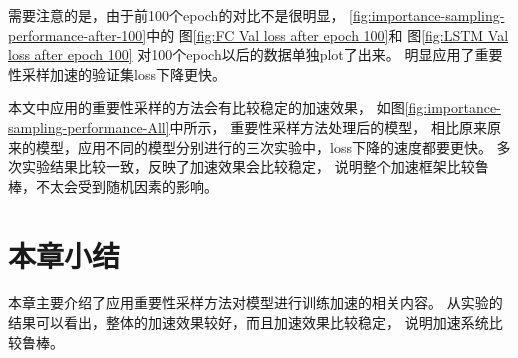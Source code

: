   需要注意的是，由于前100个epoch的对比不是很明显，
  \ref{fig:importance-sampling-performance-after-100}中的
  图\ref{fig:FC Val loss after epoch 100}和
  图\ref{fig:LSTM Val loss after epoch 100}
  对100个epoch以后的数据单独plot了出来。
  明显应用了重要性采样加速的验证集loss下降更快。

  本文中应用的重要性采样的方法会有比较稳定的加速效果，
  如图\ref{fig:importance-sampling-performance-All}中所示，
  重要性采样方法处理后的模型，
  相比原来原来的模型，应用不同的模型分别进行的三次实验中，loss下降的速度都要更快。
  多次实验结果比较一致，反映了加速效果会比较稳定，
  说明整个加速框架比较鲁棒，不太会受到随机因素的影响。

\section{本章小结}
本章主要介绍了应用重要性采样方法对模型进行训练加速的相关内容。
从实验的结果可以看出，整体的加速效果较好，而且加速效果比较稳定，
说明加速系统比较鲁棒。


